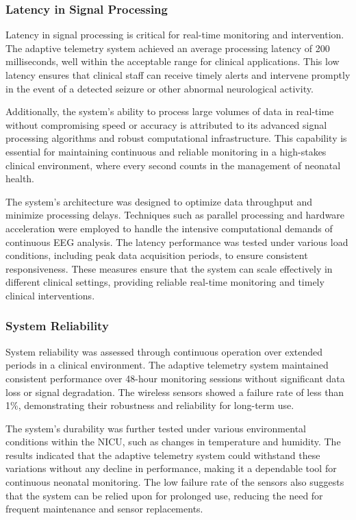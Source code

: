 \documentclass[12pt,journal,compsoc]{IEEEtran}
\begin{document}
\subsubsection{Latency in Signal Processing}

Latency in signal processing is critical for real-time monitoring and intervention. The adaptive telemetry system achieved an average processing latency of 200 milliseconds, well within the acceptable range for clinical applications. This low latency ensures that clinical staff can receive timely alerts and intervene promptly in the event of a detected seizure or other abnormal neurological activity.

Additionally, the system's ability to process large volumes of data in real-time without compromising speed or accuracy is attributed to its advanced signal processing algorithms and robust computational infrastructure. This capability is essential for maintaining continuous and reliable monitoring in a high-stakes clinical environment, where every second counts in the management of neonatal health.

The system's architecture was designed to optimize data throughput and minimize processing delays. Techniques such as parallel processing and hardware acceleration were employed to handle the intensive computational demands of continuous EEG analysis. The latency performance was tested under various load conditions, including peak data acquisition periods, to ensure consistent responsiveness. These measures ensure that the system can scale effectively in different clinical settings, providing reliable real-time monitoring and timely clinical interventions.

\subsubsection{System Reliability}

System reliability was assessed through continuous operation over extended periods in a clinical environment. The adaptive telemetry system maintained consistent performance over 48-hour monitoring sessions without significant data loss or signal degradation. The wireless sensors showed a failure rate of less than 1\%, demonstrating their robustness and reliability for long-term use.

The system's durability was further tested under various environmental conditions within the NICU, such as changes in temperature and humidity. The results indicated that the adaptive telemetry system could withstand these variations without any decline in performance, making it a dependable tool for continuous neonatal monitoring. The low failure rate of the sensors also suggests that the system can be relied upon for prolonged use, reducing the need for frequent maintenance and sensor replacements.
\end{document}
